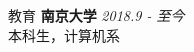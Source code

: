 \documentclass{resume} %
\begin{document}

\begin{rSection}{教育}
{\textbf{南京大学}} \hfill {\em 2018.9 - 至今} \\ 
本科生，计算机系


\end{rSection}




\end{document}
